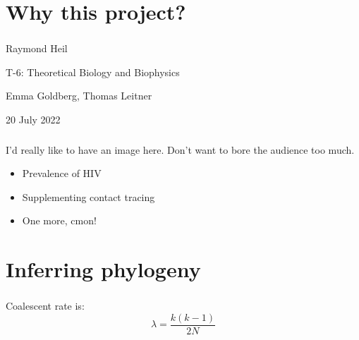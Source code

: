 \documentclass{beamer}
\begin{document}
\section{Why this project?}

\begin{frame} \frametitle{}

    \begin{center}

        \vfill

        Raymond Heil

        T-6: Theoretical Biology and Biophysics

        Emma Goldberg, Thomas Leitner

        \vfill

        \small{20 July 2022}

        \vfill
    \end{center}


\end{frame}

\begin{frame} \frametitle{\insertsection}

    I'd really like to have an image here. Don't want to bore
    the audience too much.

    \begin{itemize}
        \item Prevalence of HIV
        \item Supplementing contact tracing
        \item One more, cmon!
    \end{itemize}

\end{frame}

\section{Inferring phylogeny}

\begin{frame} \frametitle{\insertsection}

    Coalescent rate is:
    \[
        \lambda = \frac{k (k-1)}{2 N}
    \]

\end{frame}
\end{document}
